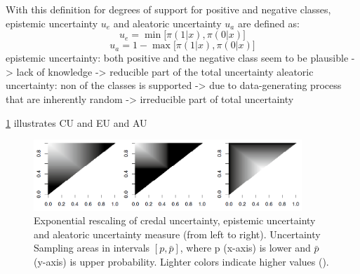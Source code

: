 With this definition for degrees of support for positive and negative classes, epistemic uncertainty $u_e$ and aleatoric uncertainty $u_a$ are defined as:
\begin{equation}
u_e = \min \bigg[ \pi(1 | x), \pi(0 | x) \bigg]
\end{equation}
\begin{equation}
u_a = 1 - \max \bigg[ \pi(1 | x), \pi(0 | x) \bigg]
\end{equation}
epistemic uncertainty: both positive and the negative class seem to be plausible -> lack of knowledge -> reducible part of the total uncertainty
aleatoric uncertainty: non of the classes is supported -> due to data-generating process that are inherently random -> irreducible part of total uncertainty


\ref{fig:uncertainty_measures} illustrates \ac{CU} and \ac{EU} and \ac{AU}

\begin{figure}[t]
  \centering
    \includegraphics[width=0.90\textwidth]{figures/uncertainty_measures.PNG}
  \caption{Exponential rescaling of credal uncertainty, epistemic uncertainty and aleatoric uncertainty measure (from left to right). 
  Uncertainty Sampling areas in intervals $[p, \bar{p}]$, where p (x-axis) is lower and $\bar{p}$ (y-axis) is upper probability. Lighter colors indicate higher values (\cite{nguyen2021howtomeasure}).}
  \label{fig:uncertainty_measures}
\end{figure}
